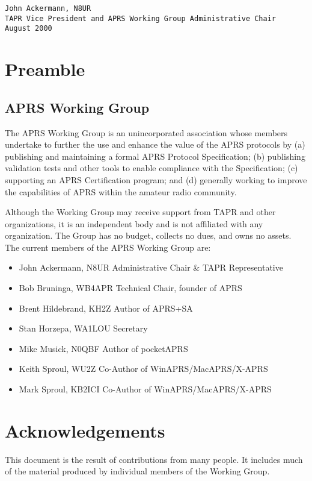 \documentclass{scrreprt}[letter]
\begin{document}
\begin{verbatim}
John Ackermann, N8UR
TAPR Vice President and APRS Working Group Administrative Chair
August 2000
\end{verbatim}


\section*{Preamble}

\subsection*{APRS Working Group}

The APRS Working Group is an unincorporated association whose members
undertake to further the use and enhance the value of the APRS protocols by
(a) publishing and maintaining a formal APRS Protocol Specification; (b)
publishing validation tests and other tools to enable compliance with the
Specification; (c) supporting an APRS Certification program; and (d) generally
working to improve the capabilities of APRS within the amateur radio
community.

Although the Working Group may receive support from TAPR and other
organizations, it is an independent body and is not affiliated with any
organization. The Group has no budget, collects no dues, and owns no assets.
The current members of the APRS Working Group are:

\begin{itemize}
\item John Ackermann, N8UR Administrative Chair \& TAPR Representative
\item Bob Bruninga, WB4APR Technical Chair, founder of APRS
\item Brent Hildebrand, KH2Z Author of APRS+SA
\item Stan Horzepa, WA1LOU Secretary
\item Mike Musick, N0QBF Author of pocketAPRS
\item Keith Sproul, WU2Z Co-Author of WinAPRS/MacAPRS/X-APRS
\item Mark Sproul, KB2ICI Co-Author of WinAPRS/MacAPRS/X-APRS
\end{itemize}

\section*{Acknowledgements}
This document is the result of contributions from many people. It includes
much of the material produced by individual members of the Working
Group.
\end{document}
